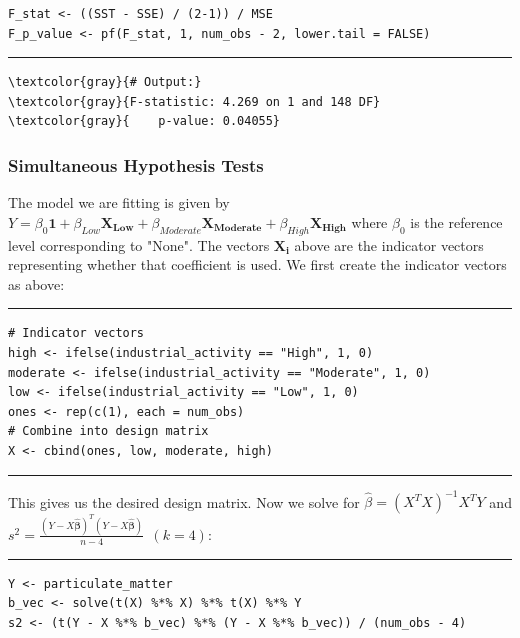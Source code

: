 \documentclass{article}
\begin{document}
\vspace{-25pt} %
\begin{verbatim}
F_stat <- ((SST - SSE) / (2-1)) / MSE
F_p_value <- pf(F_stat, 1, num_obs - 2, lower.tail = FALSE)
\end{verbatim}
\vspace{-15pt} %
\par\noindent\rule{\textwidth}{0.4pt}
\begin{Verbatim}[commandchars=\\\{\}]
\textcolor{gray}{# Output:}
\textcolor{gray}{F-statistic: 4.269 on 1 and 148 DF}
\textcolor{gray}{    p-value: 0.04055}
\end{Verbatim}
\subsubsection*{Simultaneous Hypothesis Tests}
The model we are fitting is given by $Y = \beta_0 \mathbf{1} + \beta_{Low}\mathbf{X_{Low}} + \beta_{Moderate}\mathbf{X_{Moderate}} + \beta_{High}\mathbf{X_{High}}$ where $\beta_0$ is the reference level corresponding to "None". The vectors $\mathbf{X_i}$ above are the indicator vectors representing whether that coefficient is used. We first create the indicator vectors as above:
\par\noindent\rule{\textwidth}{0.4pt}
\vspace{-25pt} %
\begin{verbatim}
# Indicator vectors
high <- ifelse(industrial_activity == "High", 1, 0)
moderate <- ifelse(industrial_activity == "Moderate", 1, 0)
low <- ifelse(industrial_activity == "Low", 1, 0)
ones <- rep(c(1), each = num_obs)
# Combine into design matrix
X <- cbind(ones, low, moderate, high) 
\end{verbatim}
\vspace{-15pt} %
\par\noindent\rule{\textwidth}{0.4pt}
This gives us the desired design matrix. Now we solve for $\hat{\beta} = (X^T X)^{-1}X^TY$ and $s^2 = \frac{(Y - X \mathbf{\hat{\beta}})^T(Y - X \mathbf{\hat{\beta}})}{n-4} \ \ (k=4)$:
\par\noindent\rule{\textwidth}{0.4pt}
\vspace{-25pt} %
\begin{verbatim}
Y <- particulate_matter
b_vec <- solve(t(X) %*% X) %*% t(X) %*% Y
s2 <- (t(Y - X %*% b_vec) %*% (Y - X %*% b_vec)) / (num_obs - 4)
\end{verbatim}
\end{document}
